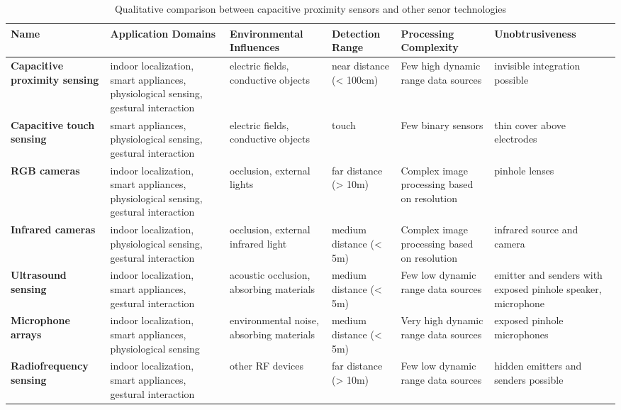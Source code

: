 \begin{table}[htbp]
  \centering
  \footnotesize
  \caption{Qualitative comparison between capacitive proximity sensors and other senor technologies}
    \begin{tabularx}{\linewidth}{Xp{4cm}XXXX}
    \toprule
    \textbf{Name} & \textbf{Application Domains} & \textbf{Environmental Influences} & \textbf{Detection Range} & \textbf{Processing Complexity} & \textbf{Unobtrusiveness} \\
    \midrule
    \textbf{Capacitive proximity sensing} & indoor localization, smart appliances, physiological sensing, gestural interaction & electric fields, conductive objects & near distance   (< 100cm) & Few high dynamic range data sources  & invisible integration possible \\ \addlinespace
    \textbf{Capacitive touch sensing} & smart appliances, physiological sensing, gestural interaction & electric fields, conductive objects & touch  & Few binary sensors & thin cover above electrodes \\ \addlinespace
    \textbf{RGB cameras } & indoor localization, smart appliances, physiological sensing, gestural interaction & occlusion, external lights & far distance     (> 10m) & Complex image processing based on resolution & pinhole lenses \\ \addlinespace
    \textbf{Infrared cameras} & indoor localization, physiological sensing, gestural interaction & occlusion, external infrared light & medium distance (< 5m) & Complex image processing based on resolution & infrared source and camera \\ \addlinespace
    \textbf{Ultrasound sensing} & indoor localization, smart appliances, gestural interaction & acoustic occlusion, absorbing materials & medium distance (< 5m) & Few low dynamic range data sources & emitter and senders with exposed pinhole speaker, microphone \\ \addlinespace
    \textbf{Microphone arrays} & indoor localization, smart appliances, physiological sensing & environmental noise, absorbing materials & medium distance (< 5m) & Very high dynamic range data sources & exposed pinhole microphones \\ \addlinespace
    \textbf{Radiofrequency sensing} & indoor localization, smart appliances, gestural interaction & other RF devices & far distance     (> 10m) & Few low dynamic range data sources & hidden emitters and senders possible \\
    \bottomrule
    \end{tabularx}%
  \label{tab:eval_sensortech}%
\end{table}%

